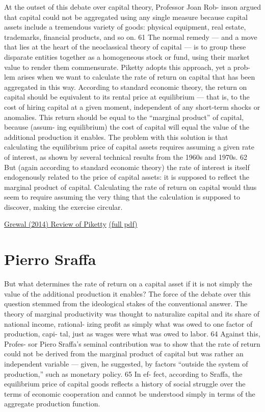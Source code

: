 \documentclass[
]{book}
\begin{document}
At the outset of this debate over capital theory, Professor Joan Rob-
inson argued that capital could not be aggregated using any single
measure because capital assets include a tremendous variety of goods:
physical equipment, real estate, trademarks, financial products, and so
on. 61 The normal remedy --- and a move that lies at the heart of the
neoclassical theory of capital --- is to group these disparate entities
together as a homogeneous stock or fund, using their market value to
render them commensurate. Piketty adopts this approach, yet a prob-
lem arises when we want to calculate the rate of return on capital that
has been aggregated in this way. According to standard economic theory,
the return on capital should be equivalent to its rental price at
equilibrium --- that is, to the cost of hiring capital at a given moment,
independent of any short-term shocks or anomalies. This return
should be equal to the ``marginal product'' of capital, because (assum-
ing equilibrium) the cost of capital will equal the value of the
additional production it enables. The problem with this solution is that
calculating the equilibrium price of capital assets requires assuming a
given rate of interest, as shown by several technical results from the
1960s and 1970s. 62 But (again according to standard economic theory)
the rate of interest is itself endogenously related to the price of capital
assets: it is supposed to reflect the marginal product of capital.
Calculating the rate of return on capital would thus seem to require
assuming the very thing that the calculation is supposed to discover, making
the exercise circular.

\href{https://harvardlawreview.org/2014/12/the-laws-of-capitalism/}{Grewal (2014) Review of Piketty}
\href{pdf/Grewal_2014_laws_of_Capitalism.pdf}{(full pdf)}

\hypertarget{pierro-sraffa}{%
\section{Pierro Sraffa}\label{pierro-sraffa}}

But what determines the rate of return on a capital asset if it is not
simply the value of the additional production it enables? The force of
the debate over this question stemmed from the ideological stakes of
the conventional answer. The theory of marginal productivity was
thought to naturalize capital and its share of national income, rational-
izing profit as simply what was owed to one factor of production, capi-
tal, just as wages were what was owed to labor. 64 Against this, Profes-
sor Piero Sraffa's seminal contribution was to show that the rate of
return could not be derived from the marginal product of capital but
was rather an independent variable --- given, he suggested, by factors
``outside the system of production,'' such as monetary policy. 65 In ef-
fect, according to Sraffa, the equilibrium price of capital goods reflects
a history of social struggle over the terms of economic cooperation and
cannot be understood simply in terms of the aggregate production
function.
\end{document}
